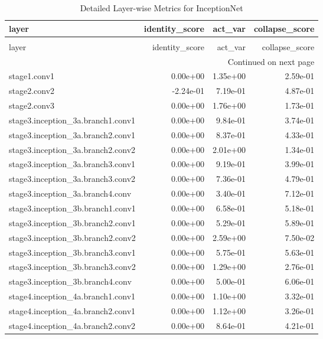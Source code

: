 \begin{longtable}{lrrr}
\caption{Detailed Layer-wise Metrics for InceptionNet} \label{tab:layer_metrics_inceptionnet} \\
\toprule
layer & identity_score & act_var & collapse_score \\
\midrule
\endfirsthead
\caption[]{Detailed Layer-wise Metrics for InceptionNet} \\
\toprule
layer & identity_score & act_var & collapse_score \\
\midrule
\endhead
\midrule
\multicolumn{4}{r}{Continued on next page} \\
\midrule
\endfoot
\bottomrule
\endlastfoot
stage1.conv1 & 0.00e+00 & 1.35e+00 & 2.59e-01 \\
stage2.conv2 & -2.24e-01 & 7.19e-01 & 4.87e-01 \\
stage2.conv3 & 0.00e+00 & 1.76e+00 & 1.73e-01 \\
stage3.inception_3a.branch1.conv1 & 0.00e+00 & 9.84e-01 & 3.74e-01 \\
stage3.inception_3a.branch2.conv1 & 0.00e+00 & 8.37e-01 & 4.33e-01 \\
stage3.inception_3a.branch2.conv2 & 0.00e+00 & 2.01e+00 & 1.34e-01 \\
stage3.inception_3a.branch3.conv1 & 0.00e+00 & 9.19e-01 & 3.99e-01 \\
stage3.inception_3a.branch3.conv2 & 0.00e+00 & 7.36e-01 & 4.79e-01 \\
stage3.inception_3a.branch4.conv & 0.00e+00 & 3.40e-01 & 7.12e-01 \\
stage3.inception_3b.branch1.conv1 & 0.00e+00 & 6.58e-01 & 5.18e-01 \\
stage3.inception_3b.branch2.conv1 & 0.00e+00 & 5.29e-01 & 5.89e-01 \\
stage3.inception_3b.branch2.conv2 & 0.00e+00 & 2.59e+00 & 7.50e-02 \\
stage3.inception_3b.branch3.conv1 & 0.00e+00 & 5.75e-01 & 5.63e-01 \\
stage3.inception_3b.branch3.conv2 & 0.00e+00 & 1.29e+00 & 2.76e-01 \\
stage3.inception_3b.branch4.conv & 0.00e+00 & 5.00e-01 & 6.06e-01 \\
stage4.inception_4a.branch1.conv1 & 0.00e+00 & 1.10e+00 & 3.32e-01 \\
stage4.inception_4a.branch2.conv1 & 0.00e+00 & 1.12e+00 & 3.26e-01 \\
stage4.inception_4a.branch2.conv2 & 0.00e+00 & 8.64e-01 & 4.21e-01 \\

\end{longtable}
